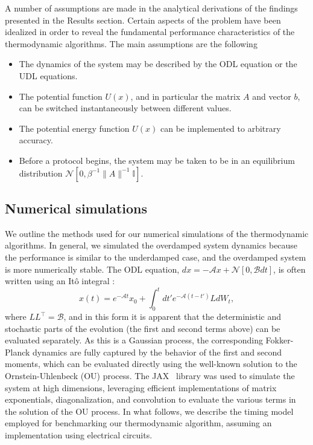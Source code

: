\documentclass[prx,onecolumn,floatfix,longbibliography,notitlepage, nofootinbib]{revtex4-1}
\begin{document}
A number of assumptions are made in the analytical derivations of the findings presented in the Results section. Certain aspects of the problem have been idealized in order to reveal the fundamental performance characteristics of the thermodynamic algorithms. The main assumptions are the following
\begin{itemize}
    \item The dynamics of the system may be described by the ODL equation or the UDL equations.
    \item The potential function $U(x)$, and in particular the matrix $A$ and vector $b$, can be switched instantaneously between different values.
    \item The potential energy function $U(x)$ can be implemented to arbitrary accuracy.
    \item Before a protocol begins, the system may be taken to be in an equilibrium distribution $\mathcal{N}[0, \beta^{-1}\|A\|^{-1}\mathbb{I}]$.
\end{itemize}







\subsection{Numerical simulations}

We outline the methods used for our numerical simulations of the thermodynamic algorithms. In general, we simulated the overdamped system dynamics because the performance is similar to the underdamped case, and the overdamped system is more numerically stable. The ODL equation, $dx = - \mathcal{A}x + \mathcal{N}[0, \mathcal{B} dt]$, is often written using an Itô integral \cite{gardiner1985handbook}:
\begin{equation}
\label{eq:ou-process-ito}
    x(t) = e^{-\mathcal{A} t}x_0 + \int_{0}^t dt' e^{-\mathcal{A}(t-t')} Ld W_t,
\end{equation}
where $L L^\intercal=\mathcal{B}$, and in this form it is apparent that the deterministic and stochastic parts of the evolution (the first and second terms above) can be evaluated separately. As this is a Gaussian process, the corresponding Fokker-Planck dynamics are fully captured by the behavior of the first and second moments, which can be evaluated directly using the well-known solution to the Ornstein-Uhlenbeck (OU) process. The JAX~\cite{frostig2018compiling} library was used to simulate the system at high dimensions, leveraging efficient implementations of matrix exponentials, diagonalization, and convolution to evaluate the various terms in the solution of the OU process. In what follows, we describe the timing model employed for benchmarking our thermodynamic algorithm, assuming an implementation using electrical circuits.
\end{document}
